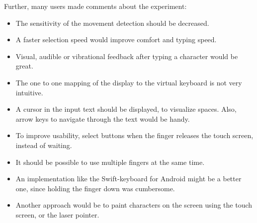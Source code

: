 Further, many users made comments about the experiment:
\begin{itemize}
	\item The sensitivity of the movement detection should be decreased.
	\item A faster selection speed would improve comfort and typing speed.
	\item Visual, audible or vibrational feedback after typing a character would be great.
	\item The one to one mapping of the display to the virtual keyboard is not very intuitive.
	\item A cursor in the input text should be displayed, to visualize spaces. Also, arrow keys to navigate through the text would be handy.
	\item To improve usability, select buttons when the finger releases the touch screen, instead of waiting.
	\item It should be possible to use multiple fingers at the same time.
	\item An implementation like the Swift-keyboard for Android might be a better one, since holding the finger down was cumbersome.
	\item Another approach would be to paint characters on the screen using the touch screen, or the laser pointer.
\end{itemize}
